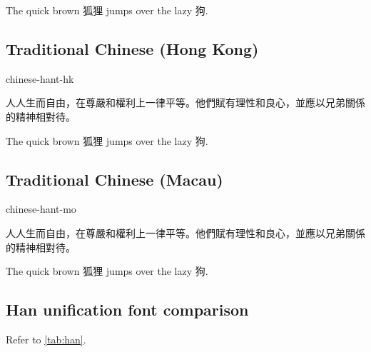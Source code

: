 \documentclass[11pt, a4paper]{article}
\begin{document}
			The quick brown \foreignlanguage{chinese-hant}{狐狸} jumps over the lazy \foreignlanguage{chinese-hant}{狗}.

		\subsection{Traditional Chinese (Hong Kong)}

			\begin{selectlanguage}{chinese-hant-hk}
				\begin{displayquote}
					人人生而自由，在尊嚴和權利上一律平等。他們賦有理性和良心，並應以兄弟關係的精神相對待。
				\end{displayquote}
			\end{selectlanguage}

			The quick brown \foreignlanguage{chinese-hant-hk}{狐狸} jumps over the lazy \foreignlanguage{chinese-hant-hk}{狗}.

		\subsection{Traditional Chinese (Macau)}

			\begin{selectlanguage}{chinese-hant-mo}
				\begin{displayquote}
					人人生而自由，在尊嚴和權利上一律平等。他們賦有理性和良心，並應以兄弟關係的精神相對待。
				\end{displayquote}
			\end{selectlanguage}

			The quick brown \foreignlanguage{chinese-hant-mo}{狐狸} jumps over the lazy \foreignlanguage{chinese-hant-mo}{狗}.

		\subsection{Han unification font comparison}

			Refer to \autoref{tab:han}.
\end{document}
